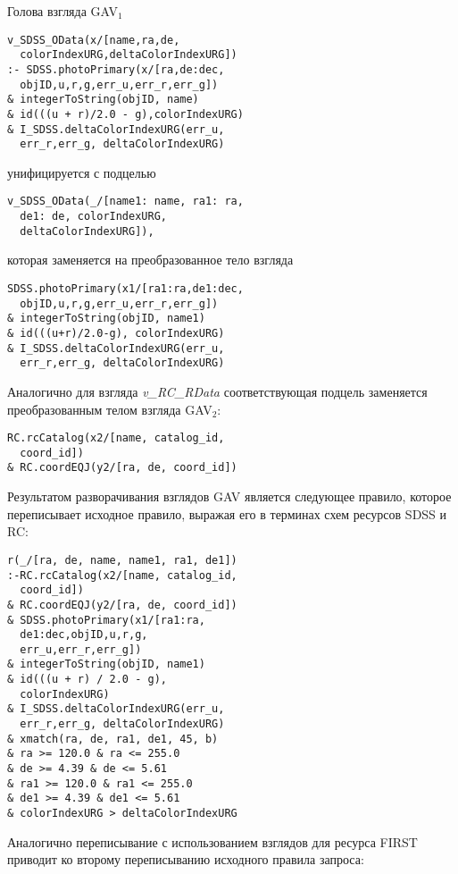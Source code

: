 \begin{multicols}{2}
Голова взгляда GAV$_1$
\begin{verbatim}
v_SDSS_OData(x/[name,ra,de,
  colorIndexURG,deltaColorIndexURG])
:- SDSS.photoPrimary(x/[ra,de:dec,
  objID,u,r,g,err_u,err_r,err_g])
& integerToString(objID, name)
& id(((u + r)/2.0 - g),colorIndexURG)
& I_SDSS.deltaColorIndexURG(err_u,
  err_r,err_g, deltaColorIndexURG)
\end{verbatim}
унифицируется с подцелью
     \begin{verbatim}
v_SDSS_OData(_/[name1: name, ra1: ra,
  de1: de, colorIndexURG,
  deltaColorIndexURG]),
\end{verbatim}
 которая заменяется на преобразованное тело \linebreak
 \mbox{взгляда}
     \begin{verbatim}
SDSS.photoPrimary(x1/[ra1:ra,de1:dec,
  objID,u,r,g,err_u,err_r,err_g])
& integerToString(objID, name1)
& id(((u+r)/2.0-g), colorIndexURG)
& I_SDSS.deltaColorIndexURG(err_u,
  err_r,err_g, deltaColorIndexURG)
     \end{verbatim}

     Аналогично для взгляда \textit{v\_RC\_RData} соответствующая подцель заменяется
преобразованным телом взгляда GAV$_2$:
     \begin{verbatim}
RC.rcCatalog(x2/[name, catalog_id,
  coord_id])
& RC.coordEQJ(y2/[ra, de, coord_id])
\end{verbatim}

     Результатом разворачивания взглядов GAV является следующее правило, которое
переписывает исходное правило, выражая его в терминах схем ресурсов SDSS и RC:
\begin{verbatim}
r(_/[ra, de, name, name1, ra1, de1])
:-RC.rcCatalog(x2/[name, catalog_id,
  coord_id])
& RC.coordEQJ(y2/[ra, de, coord_id])
& SDSS.photoPrimary(x1/[ra1:ra,
  de1:dec,objID,u,r,g,
  err_u,err_r,err_g])
& integerToString(objID, name1)
& id(((u + r) / 2.0 - g),
  colorIndexURG)
& I_SDSS.deltaColorIndexURG(err_u,
  err_r,err_g, deltaColorIndexURG)
& xmatch(ra, de, ra1, de1, 45, b)
& ra >= 120.0 & ra <= 255.0
& de >= 4.39 & de <= 5.61
& ra1 >= 120.0 & ra1 <= 255.0
& de1 >= 4.39 & de1 <= 5.61
& colorIndexURG > deltaColorIndexURG
     \end{verbatim}

\vspace*{-6pt}

     Аналогично переписывание с использованием взглядов для ресурса FIRST приводит
ко второму переписыванию исходного правила запроса:


\end{multicols}
